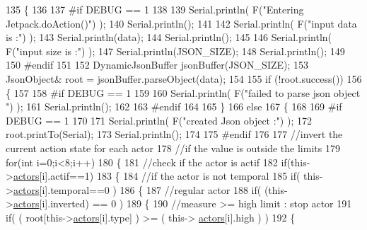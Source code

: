 \begin{DoxyCode}
135 \{
136 
137 \textcolor{preprocessor}{#if DEBUG == 1 }
138 
139     Serial.println( F(\textcolor{stringliteral}{"Entering Jetpack.doAction()"}) );
140     Serial.println();
141 
142     Serial.println( F(\textcolor{stringliteral}{"input data is :"}) );
143     Serial.println(data);
144     Serial.println();
145 
146     Serial.println( F(\textcolor{stringliteral}{"input size is :"}) ); 
147     Serial.println(JSON\_SIZE);
148     Serial.println();
149 
150 \textcolor{preprocessor}{#endif }
151 
152     DynamicJsonBuffer jsonBuffer(JSON\_SIZE);
153     JsonObject& root = jsonBuffer.parseObject(data);
154     
155     \textcolor{keywordflow}{if} (!root.success()) 
156     \{
157     
158 \textcolor{preprocessor}{    #if DEBUG == 1 }
159 
160         Serial.println( F(\textcolor{stringliteral}{"failed to parse json object "}) );
161         Serial.println();
162     
163 \textcolor{preprocessor}{    #endif }
164 
165     \}
166     \textcolor{keywordflow}{else}
167     \{
168     
169 \textcolor{preprocessor}{    #if DEBUG == 1 }
170 
171         Serial.println( F(\textcolor{stringliteral}{"created Json object :"}) );
172         root.printTo(Serial);
173         Serial.println();
174     
175 \textcolor{preprocessor}{    #endif }
176 
177         \textcolor{comment}{//invert the current action state for each actor}
178         \textcolor{comment}{//if the value is outside the limits}
179         \textcolor{keywordflow}{for}(\textcolor{keywordtype}{int} i=0;i<8;i++)
180         \{
181             \textcolor{comment}{//check if the actor is actif }
182             \textcolor{keywordflow}{if}(this->\hyperlink{classJetpack_a7e16d2f97837f9712a2e6de1c50d99db}{actors}[i].actif==1)
183             \{   
184                 \textcolor{comment}{//if the actor is not temporal}
185                 \textcolor{keywordflow}{if}( this->\hyperlink{classJetpack_a7e16d2f97837f9712a2e6de1c50d99db}{actors}[i].temporal==0 ) 
186                 \{   
187                     \textcolor{comment}{//regular actor}
188                     \textcolor{keywordflow}{if}( (this->\hyperlink{classJetpack_a7e16d2f97837f9712a2e6de1c50d99db}{actors}[i].inverted) == 0 )
189                     \{
190                         \textcolor{comment}{//measure >= high limit : stop actor}
191                         \textcolor{keywordflow}{if}( ( root[this->\hyperlink{classJetpack_a7e16d2f97837f9712a2e6de1c50d99db}{actors}[i].type] ) >= ( this->
      \hyperlink{classJetpack_a7e16d2f97837f9712a2e6de1c50d99db}{actors}[i].high ) )    
192                         \{   

\end{DoxyCode}

